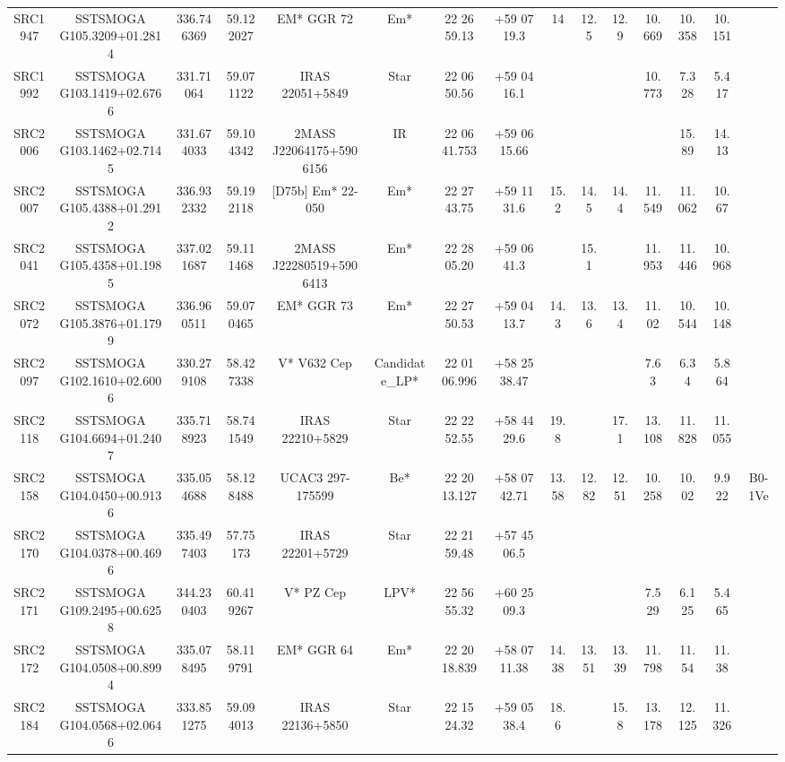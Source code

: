 \begin{table}
\begin{tabular}{ccccccccccccccc}
SRC1947 & SSTSMOGA G105.3209+01.2814 & 336.746369 & 59.122027 & EM* GGR   72 & Em* & 22 26 59.13 & +59 07 19.3 & 14 & 12.5 & 12.9 & 10.669 & 10.358 & 10.151 &  \\
SRC1992 & SSTSMOGA G103.1419+02.6766 & 331.71064 & 59.071122 & IRAS 22051+5849 & Star & 22 06 50.56 & +59 04 16.1 &  &  &  & 10.773 & 7.328 & 5.417 &  \\
SRC2006 & SSTSMOGA G103.1462+02.7145 & 331.674033 & 59.104342 & 2MASS J22064175+5906156 & IR & 22 06 41.753 & +59 06 15.66 &  &  &  &  & 15.89 & 14.13 &  \\
SRC2007 & SSTSMOGA G105.4388+01.2912 & 336.932332 & 59.192118 & [D75b] Em* 22-050 & Em* & 22 27 43.75 & +59 11 31.6 & 15.2 & 14.5 & 14.4 & 11.549 & 11.062 & 10.67 &  \\
SRC2041 & SSTSMOGA G105.4358+01.1985 & 337.021687 & 59.111468 & 2MASS J22280519+5906413 & Em* & 22 28 05.20 & +59 06 41.3 &  & 15.1 &  & 11.953 & 11.446 & 10.968 &  \\
SRC2072 & SSTSMOGA G105.3876+01.1799 & 336.960511 & 59.070465 & EM* GGR   73 & Em* & 22 27 50.53 & +59 04 13.7 & 14.3 & 13.6 & 13.4 & 11.02 & 10.544 & 10.148 &  \\
SRC2097 & SSTSMOGA G102.1610+02.6006 & 330.279108 & 58.427338 & V* V632 Cep & Candidate_LP* & 22 01 06.996 & +58 25 38.47 &  &  &  & 7.63 & 6.34 & 5.864 &  \\
SRC2118 & SSTSMOGA G104.6694+01.2407 & 335.718923 & 58.741549 & IRAS 22210+5829 & Star & 22 22 52.55 & +58 44 29.6 & 19.8 &  & 17.1 & 13.108 & 11.828 & 11.055 &  \\
SRC2158 & SSTSMOGA G104.0450+00.9136 & 335.054688 & 58.128488 & UCAC3 297-175599 & Be* & 22 20 13.127 & +58 07 42.71 & 13.58 & 12.82 & 12.51 & 10.258 & 10.02 & 9.922 & B0-1Ve \\
SRC2170 & SSTSMOGA G104.0378+00.4696 & 335.497403 & 57.75173 & IRAS 22201+5729 & Star & 22 21 59.48 & +57 45 06.5 &  &  &  &  &  &  &  \\
SRC2171 & SSTSMOGA G109.2495+00.6258 & 344.230403 & 60.419267 & V* PZ Cep & LPV* & 22 56 55.32 & +60 25 09.3 &  &  &  & 7.529 & 6.125 & 5.465 &  \\
SRC2172 & SSTSMOGA G104.0508+00.8994 & 335.078495 & 58.119791 & EM* GGR   64 & Em* & 22 20 18.839 & +58 07 11.38 & 14.38 & 13.51 & 13.39 & 11.798 & 11.54 & 11.38 &  \\
SRC2184 & SSTSMOGA G104.0568+02.0646 & 333.851275 & 59.094013 & IRAS 22136+5850 & Star & 22 15 24.32 & +59 05 38.4 & 18.6 &  & 15.8 & 13.178 & 12.125 & 11.326 &  \\

\end{tabular}
\end{table}

